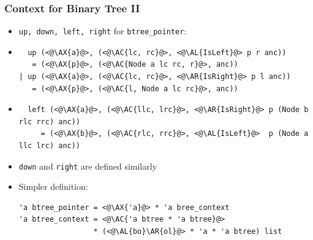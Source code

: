 \begin{frame}[fragile]
\frametitle{Context for Binary Tree II}

\newcommand{\AX}[1]{\textcolor{red}{#1}}
\newcommand{\AC}[1]{\textcolor{blue}{#1}}
\newcommand{\AL}[1]{\textcolor[RGB]{0,170,0}{#1}}
\newcommand{\AR}[1]{\textcolor{cyan}{#1}}
\newcommand{\AT}[1]{\textcolor{gray}{#1}}

\begin{itemize}
\item \lstinline|up, down, left, right| for \lstinline|btree_pointer|:

\item
\begin{lstlisting}
  up (<@\AX{a}@>, (<@\AC{lc, rc}@>, <@\AL{IsLeft}@> p r anc))
   = (<@\AX{p}@>, (<@\AC{Node a lc rc, r}@>, anc))
| up (<@\AX{a}@>, (<@\AC{lc, rc}@>, <@\AR{IsRight}@> p l anc))
   = (<@\AX{p}@>, (<@\AC{l, Node a lc rc}@>, anc))
\end{lstlisting}

\item
\begin{lstlisting}
  left (<@\AX{a}@>, (<@\AC{llc, lrc}@>, <@\AR{IsRight}@> p (Node b rlc rrc) anc))
     = (<@\AX{b}@>, (<@\AC{rlc, rrc}@>, <@\AL{IsLeft}@>  p (Node a llc lrc) anc))
\end{lstlisting}

\item \lstinline|down| and \lstinline|right| are defined similarly

\item Simpler definition:\\
\begin{lstlisting}
'a btree_pointer = <@\AX{'a}@> * 'a bree_context
'a btree_context = <@\AC{'a btree * 'a btree}@>
                 * (<@\AL{bo}\AR{ol}@> * 'a * 'a btree) list
\end{lstlisting}
\end{itemize}
\end{frame}

